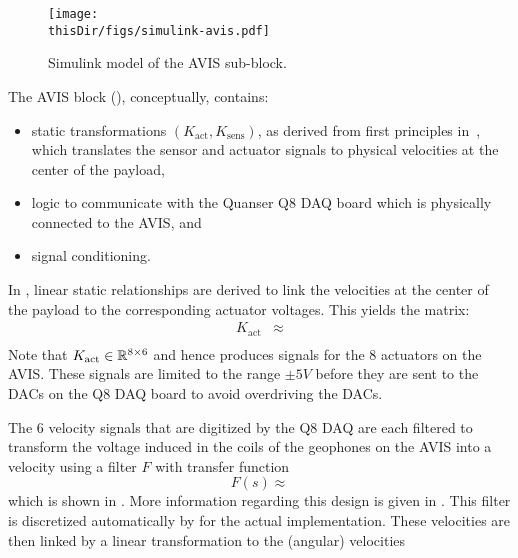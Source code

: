 \begin{figure}[p]
\setlength\figurewidth{\columnwidth}
  \texttt{[image: \\thisDir/figs/simulink-avis.pdf]}
  \caption{Simulink model of the AVIS sub-block.}
  \label{fig:avis:simulink:avis}
\end{figure}

The \gls{AVIS} block (), conceptually, contains:
\begin{itemize}
  \item static transformations $(K_{\mathrm{act}}, K_{\mathrm{sens}})$, as derived from first principles in~\citep{Rademakers2005MSc}, which translates the sensor and actuator signals to physical velocities at the center of the payload,
  \item logic to communicate with the Quanser Q8 \gls{DAQ} board which is physically connected to the \gls{AVIS}, and
  \item signal conditioning.
\end{itemize}

In \citet[Appendix A.4]{Rademakers2005MSc}, linear static relationships are derived to link the velocities at the center of the payload to the corresponding actuator voltages.
This yields the matrix:
\begin{align}
  K_{\mathrm{act}}    & \approx \\
\end{align}
Note that $K_{\mathrm{act}} \in \mathbb{R}^{8\times6}$ and hence produces signals for the $8$ actuators on the \gls{AVIS}.
These signals are limited to the range $\pm 5\unit{V}$ before they are sent to the \glspl{DAC} on the Q8 \gls{DAQ} board to avoid overdriving the \glspl{DAC}.

The $6$ velocity signals that are digitized by the Q8 \gls{DAQ} are each filtered to transform the voltage induced in the coils of the geophones on the \gls{AVIS} into a velocity using a filter $F$ with transfer function
\begin{equation}
  F(s) \approx 
\end{equation}
which is shown in .
More information regarding this design is given in \citep[Appendix A.3]{Rademakers2005MSc}.
This filter is discretized automatically by \Simulink for the actual implementation.
These velocities are then linked by a linear transformation to the (angular) velocities

